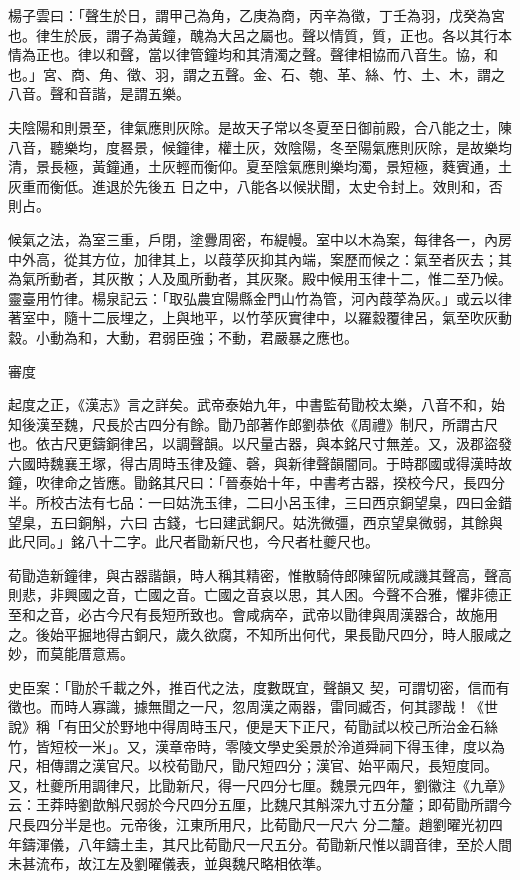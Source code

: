 \begin{pinyinscope}
 楊子雲曰：「聲生於日，謂甲己為角，乙庚為商，丙辛為徵，丁壬為羽，戊癸為宮也。律生於辰，謂子為黃鐘，醜為大呂之屬也。聲以情質，質，正也。各以其行本情為正也。律以和聲，當以律管鐘均和其清濁之聲。聲律相協而八音生。協，和也。」宮、商、角、徵、羽，謂之五聲。金、石、匏、革、絲、竹、土、木，謂之八音。聲和音諧，是謂五樂。



 夫陰陽和則景至，律氣應則灰除。是故天子常以冬夏至日御前殿，合八能之士，陳八音，聽樂均，度晷景，候鐘律，權土灰，效陰陽，冬至陽氣應則灰除，是故樂均清，景長極，黃鐘通，土灰輕而衡仰。夏至陰氣應則樂均濁，景短極，蕤賓通，土灰重而衡低。進退於先後五
 日之中，八能各以候狀聞，太史令封上。效則和，否則占。



 候氣之法，為室三重，戶閉，塗釁周密，布緹幔。室中以木為案，每律各一，內房中外高，從其方位，加律其上，以葭莩灰抑其內端，案歷而候之：氣至者灰去；其為氣所動者，其灰散；人及風所動者，其灰聚。殿中候用玉律十二，惟二至乃候。靈臺用竹律。楊泉記云：「取弘農宜陽縣金門山竹為管，河內葭莩為灰。」或云以律著室中，隨十二辰埋之，上與地平，以竹莩灰實律中，以羅縠覆律呂，氣至吹灰動縠。小動為和，大動，君弱臣強；不動，君嚴暴之應也。



 審度



 起度之正，《漢志》言之詳矣。武帝泰始九年，中書監荀勖校太樂，八音不和，始知後漢至魏，尺長於古四分有餘。勖乃部著作郎劉恭依《周禮》制尺，所謂古尺也。依古尺更鑄銅律呂，以調聲韻。以尺量古器，與本銘尺寸無差。又，汲郡盜發六國時魏襄王塚，得古周時玉律及鐘、磬，與新律聲韻闇同。于時郡國或得漢時故鐘，吹律命之皆應。勖銘其尺曰：「晉泰始十年，中書考古器，揆校今尺，長四分半。所校古法有七品：一曰姑洗玉律，二曰小呂玉律，三曰西京銅望臬，四曰金錯望臬，五曰銅斛，六曰
 古錢，七曰建武銅尺。姑洗微彊，西京望臬微弱，其餘與此尺同。」銘八十二字。此尺者勖新尺也，今尺者杜夔尺也。



 荀勖造新鐘律，與古器諧韻，時人稱其精密，惟散騎侍郎陳留阮咸譏其聲高，聲高則悲，非興國之音，亡國之音。亡國之音哀以思，其人困。今聲不合雅，懼非德正至和之音，必古今尺有長短所致也。會咸病卒，武帝以勖律與周漢器合，故施用之。後始平掘地得古銅尺，歲久欲腐，不知所出何代，果長勖尺四分，時人服咸之妙，而莫能厝意焉。



 史臣案：「勖於千載之外，推百代之法，度數既宜，聲韻又
 契，可謂切密，信而有徵也。而時人寡識，據無聞之一尺，忽周漢之兩器，雷同臧否，何其謬哉！《世說》稱「有田父於野地中得周時玉尺，便是天下正尺，荀勖試以校己所治金石絲竹，皆短校一米」。又，漢章帝時，零陵文學史奚景於泠道舜祠下得玉律，度以為尺，相傳謂之漢官尺。以校荀勖尺，勖尺短四分；漢官、始平兩尺，長短度同。又，杜夔所用調律尺，比勖新尺，得一尺四分七厘。魏景元四年，劉徽注《九章》云：王莽時劉歆斛尺弱於今尺四分五厘，比魏尺其斛深九寸五分釐；即荀勖所謂今尺長四分半是也。元帝後，江東所用尺，比荀勖尺一尺六
 分二釐。趙劉曜光初四年鑄渾儀，八年鑄土圭，其尺比荀勖尺一尺五分。荀勖新尺惟以調音律，至於人間未甚流布，故江左及劉曜儀表，並與魏尺略相依準。




\end{pinyinscope}
